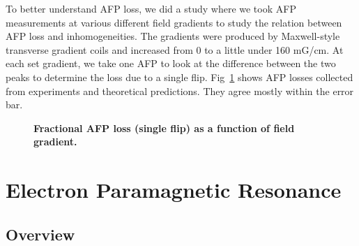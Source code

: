 To better understand AFP loss, we did a study where we took AFP measurements at various different field gradients to study the relation between AFP loss and inhomogeneities. The gradients were produced by Maxwell-style transverse gradient coils and increased from 0 to a little under 160 mG/cm. At each set gradient, we take one AFP to look at the difference between the two peaks to determine the loss due to a single flip. Fig~\ref{AFPLossvsGradient} shows AFP losses collected from experiments and theoretical predictions. They agree mostly within the error bar.

\begin{figure}[H]
	\centering
	\caption{{\bf Fractional AFP loss (single flip) as a function of field gradient.}}
	\label{AFPLossvsGradient}
\end{figure}

\section{Electron Paramagnetic Resonance}

\subsection{Overview}

